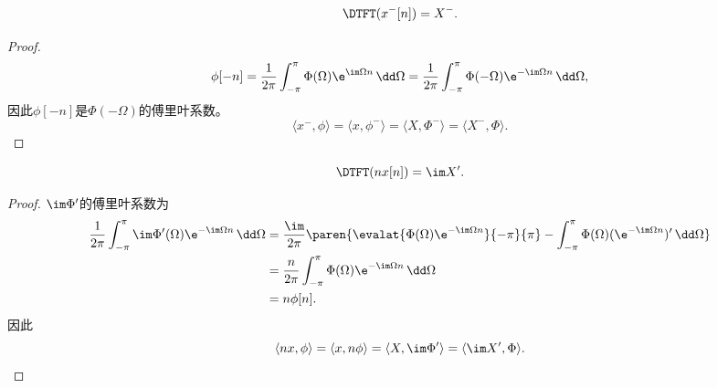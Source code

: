 \begin{proposition}[反转性质]
    \begin{equation}
        \DTFT(x^-[n])=X^-.
    \end{equation}
\end{proposition}
\begin{proof}
    \begin{equation}
        \phi[-n]=\frac{1}{2\pi}\int_{-\pi}^{\pi}\Phi(\Omega)\e^{\im\Omega n}\,\dd\Omega=\frac{1}{2\pi}\int_{-\pi}^{\pi}\Phi(-\Omega)\e^{-\im\Omega n}\,\dd\Omega,
    \end{equation}
    因此$\phi[-n]$是$\Phi(-\Omega)$的傅里叶系数。
    \begin{equation}
        \langle x^-,\phi\rangle=\langle x,\phi^-\rangle=\langle X,\Phi^-\rangle=\langle X^-,\Phi\rangle.
    \end{equation}
\end{proof}

\begin{proposition}[频域微分性质]\label{prop:DTFT_derivative}
    \begin{equation}
        \DTFT(nx[n])=\im X'.
    \end{equation}
\end{proposition}
\begin{proof}
    $\im \Phi'$的傅里叶系数为
    \begin{align}
        \frac{1}{2\pi}\int_{-\pi}^{\pi}\im \Phi'(\Omega)\e^{-\im \Omega n}\,\dd\Omega&=\frac{\im}{2\pi}\paren{\evalat{\Phi(\Omega)\e^{-\im \Omega n}}{-\pi}{\pi}-\int_{-\pi}^{\pi}\Phi(\Omega)(\e^{-\im \Omega n})'\,\dd\Omega} \nonumber \\
        &=\frac{n}{2\pi}\int_{-\pi}^{\pi}\Phi(\Omega)\e^{-\im\Omega n}\,\dd\Omega \nonumber \\
        &=n\phi[n].
    \end{align}
    因此
    \begin{equation}
        \langle nx,\phi\rangle=\langle x,n\phi\rangle=\langle X,\im\Phi'\rangle=\langle \im X',\Phi\rangle.
    \end{equation}
\end{proof}

